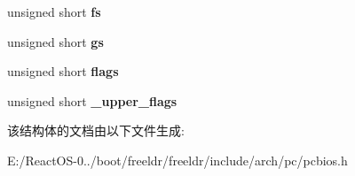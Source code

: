 \begin{DoxyCompactItemize}
unsigned short {\bfseries fs}
\item 
\mbox{\label{struct_b_y_t_e_r_e_g_s_a6f387edfdcddda921bffa441ef5b9fe2}} 
unsigned short {\bfseries gs}
\item 
\mbox{\label{struct_b_y_t_e_r_e_g_s_a82e06e5fab1184b150e2e03832cb4188}} 
unsigned short {\bfseries flags}
\item 
\mbox{\label{struct_b_y_t_e_r_e_g_s_a403f78d49ede324cb22d65806a7f4172}} 
unsigned short {\bfseries \+\_\+upper\+\_\+flags}
\end{DoxyCompactItemize}


该结构体的文档由以下文件生成\+:\begin{DoxyCompactItemize}
\item 
E\+:/\+React\+O\+S-\/0../boot/freeldr/freeldr/include/arch/pc/pcbios.\+h\end{DoxyCompactItemize}
